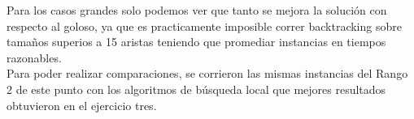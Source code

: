 Para los casos grandes solo podemos ver que tanto se mejora la solución con respecto al goloso, ya que es practicamente imposible correr backtracking sobre tamaños superios a 15 aristas teniendo que promediar instancias en tiempos razonables.\\

Para poder realizar comparaciones, se corrieron las mismas instancias del Rango 2 de este punto con los algoritmos de búsqueda local que mejores resultados obtuvieron en el ejercicio tres.\\\\

\begin{figure}[h] 
 \centering
       \label{fig:randomDist1}
    \label{fig:randomMejora1}
\end{figure}

\newpage

